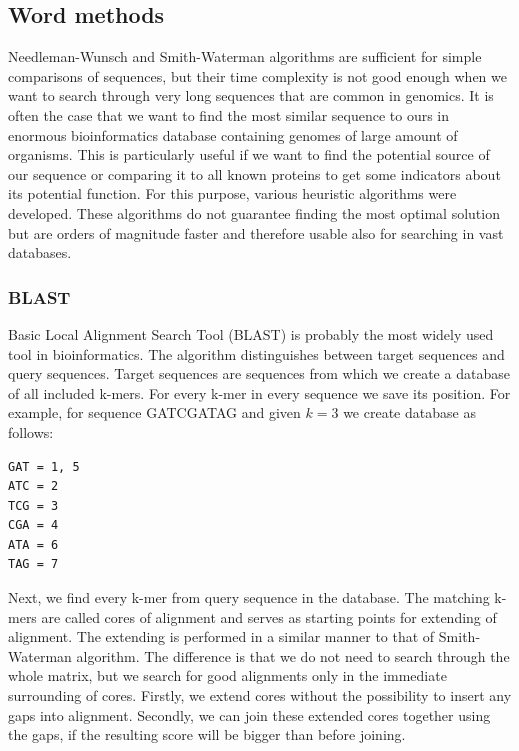 \subsection{Word methods}
Needleman-Wunsch and Smith-Waterman algorithms are sufficient for simple comparisons of sequences, but their time complexity is not good enough when we want to search through very long sequences that are common in genomics.
It is often the case that we want to find the most similar sequence to ours in enormous bioinformatics database containing genomes of large amount of organisms.
This is particularly useful if we want to find the potential source of our sequence or comparing it to all known proteins to get some indicators about its potential function.
For this purpose, various heuristic algorithms were developed.
These algorithms do not guarantee finding the most optimal solution but are orders of magnitude faster and therefore usable also for searching in vast databases.

\subsubsection{BLAST}
Basic Local Alignment Search Tool (BLAST) \cite{blast} is probably the most widely used tool in bioinformatics.
The algorithm distinguishes between target sequences and query sequences.
Target sequences are sequences from which we create a database of all included k-mers.
For every k-mer in every sequence we save its position.
For example, for sequence GATCGATAG and given $k=3$ we create database as follows:
\begin{verbatim}
GAT = 1, 5
ATC = 2
TCG = 3
CGA = 4
ATA = 6
TAG = 7
\end{verbatim}
Next, we find every k-mer from query sequence in the database.
The matching k-mers are called cores of alignment and serves as starting points for extending of alignment.
The extending is performed in a similar manner to that of Smith-Waterman algorithm.
The difference is that we do not need to search through the whole matrix, but we search for good alignments only in the immediate surrounding of cores.
Firstly, we extend cores without the possibility to insert any gaps into alignment.
Secondly, we can join these extended cores together using the gaps, if the resulting score will be bigger than before joining.

